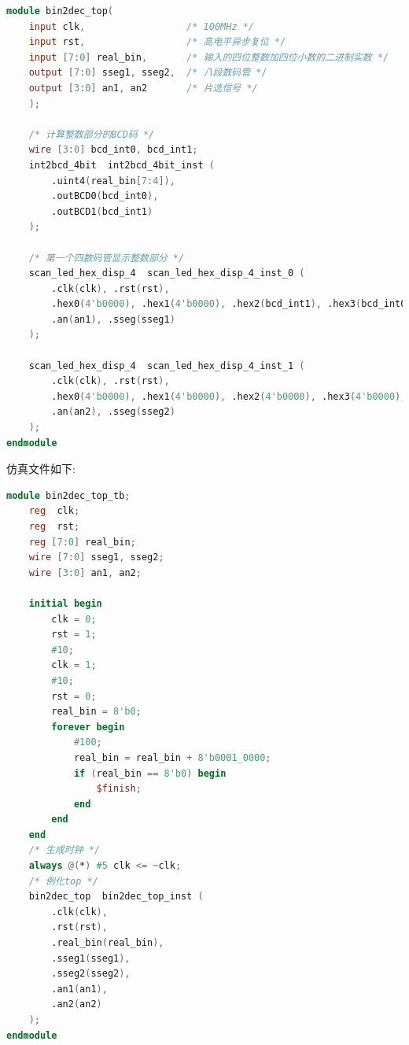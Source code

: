 \documentclass{article}
\begin{document}
\begin{lstlisting}[language=Verilog, caption={top文件}]
module bin2dec_top(
    input clk,                  /* 100MHz */
    input rst,                  /* 高电平异步复位 */
    input [7:0] real_bin,       /* 输入的四位整数加四位小数的二进制实数 */
    output [7:0] sseg1, sseg2,  /* 八段数码管 */
    output [3:0] an1, an2       /* 片选信号 */
    );

    /* 计算整数部分的BCD码 */
    wire [3:0] bcd_int0, bcd_int1;
    int2bcd_4bit  int2bcd_4bit_inst (
        .uint4(real_bin[7:4]),
        .outBCD0(bcd_int0),
        .outBCD1(bcd_int1)
    );

    /* 第一个四数码管显示整数部分 */
    scan_led_hex_disp_4  scan_led_hex_disp_4_inst_0 (
        .clk(clk), .rst(rst),
        .hex0(4'b0000), .hex1(4'b0000), .hex2(bcd_int1), .hex3(bcd_int0), .dp(4'b0001),
        .an(an1), .sseg(sseg1)
    );

    scan_led_hex_disp_4  scan_led_hex_disp_4_inst_1 (
        .clk(clk), .rst(rst),
        .hex0(4'b0000), .hex1(4'b0000), .hex2(4'b0000), .hex3(4'b0000), .dp(4'b0000),
        .an(an2), .sseg(sseg2)
    );
endmodule
\end{lstlisting}
仿真文件如下:
\begin{lstlisting}[language=Verilog, caption={整数部分仿真文件}]
module bin2dec_top_tb;
    reg  clk;
    reg  rst;
    reg [7:0] real_bin;
    wire [7:0] sseg1, sseg2;
    wire [3:0] an1, an2;

    initial begin
        clk = 0;
        rst = 1;
        #10;
        clk = 1;
        #10;
        rst = 0;
        real_bin = 8'b0;
        forever begin
            #100;
            real_bin = real_bin + 8'b0001_0000;
            if (real_bin == 8'b0) begin
                $finish;
            end  
        end
    end
    /* 生成时钟 */
    always @(*) #5 clk <= ~clk;
    /* 例化top */
    bin2dec_top  bin2dec_top_inst (
        .clk(clk),
        .rst(rst),
        .real_bin(real_bin),
        .sseg1(sseg1),
        .sseg2(sseg2),
        .an1(an1),
        .an2(an2)
    );
endmodule
\end{lstlisting}
\end{document}

